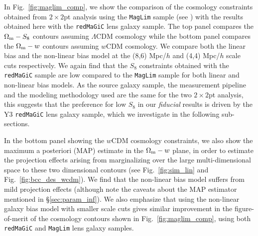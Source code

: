 \documentclass[aps, prd,twocolumn,superscriptaddress,nofootinbib,preprintnumbers]{revtex4-1}
\newcommand{\redmagic}{\texttt{redMaGiC} }
\newcommand{\maglim}{\texttt{MagLim} }
\begin{document}
In Fig.~\ref{fig:maglim_comp}, we show the comparison of the cosmology constraints obtained from $2\times 2$pt analysis using the \maglim sample (see \citet*{y3-2x2ptaltlensresults}) with the results obtained here with the \redmagic lens galaxy sample. The top panel compares the $\Omega_{\rm m}- S_8$ contours assuming $\Lambda$CDM cosmology while the bottom panel compares the $\Omega_{\rm m}- w$ contours assuming $w$CDM cosmology. We compare both the linear bias and the non-linear bias model at the (8,6) Mpc/$h$ and (4,4) Mpc/$h$ scale cuts respectively. We again find that the $S_8$ constraints obtained with the \redmagic sample are low compared to the \maglim sample for both linear and non-linear bias models. As the source galaxy sample, the measurement pipeline and the modeling methodology used are the same for the two $2\times 2$pt analysis, this suggests that the preference for low $S_8$ in our \textit{fiducial} results is driven by the Y3 \redmagic lens galaxy sample, which we investigate in the following sub-sections. 

In the bottom panel showing the $w$CDM cosmology constraints, we also show the maximum a posteriori (MAP) estimate in the $\Omega_{\rm m}- w$ plane, in order to estimate the projection effects arising from marginalizing over the large multi-dimensional space to these two dimensional contours (see Fig.~\ref{fig:sim_lin} and Fig.~\ref{fig:bcc_des_wcdm}). We find that the non-linear bias model suffers from mild projection effects (although note the caveats about the MAP estimator mentioned in \S\ref{sec:param_inf}). We also emphasize that using the non-linear galaxy bias model with smaller scale cuts gives similar improvement in the figure-of-merit of the cosmology contours shown in Fig.~\ref{fig:maglim_comp}, using both \redmagic and \maglim lens galaxy samples. 
\end{document}
